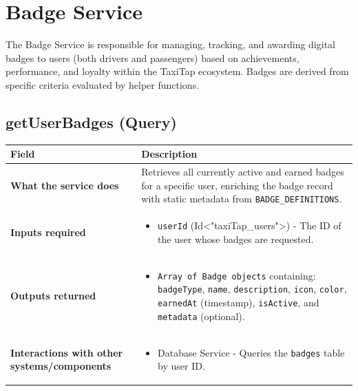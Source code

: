 \documentclass[11pt,a4paper]{article}
\begin{document}
\section{Badge Service}
\label{sec:badge-service}

The Badge Service is responsible for managing, tracking, and awarding digital badges to users (both drivers and passengers) based on achievements, performance, and loyalty within the TaxiTap ecosystem. Badges are derived from specific criteria evaluated by helper functions.

\subsection{getUserBadges (Query)}
\label{sub:getUserBadges}
\begin{longtable}{|p{4cm}|p{12cm}|}
\hline
\textbf{Field} & \textbf{Description} \\
\hline
\textbf{What the service does} & 
Retrieves all currently active and earned badges for a specific user, enriching the badge record with static metadata from \texttt{BADGE\_DEFINITIONS}. \\
\hline
\textbf{Inputs required} & 
\begin{itemize}[nosep]
\item \texttt{userId} (Id<"taxiTap\_users">) - The ID of the user whose badges are requested.
\end{itemize} \\
\hline
\textbf{Outputs returned} & 
\begin{itemize}[nosep]
\item \texttt{Array of Badge objects} containing: \texttt{badgeType}, \texttt{name}, \texttt{description}, \texttt{icon}, \texttt{color}, \texttt{earnedAt} (timestamp), \texttt{isActive}, and \texttt{metadata} (optional).
\end{itemize} \\
\hline
\textbf{Interactions with other systems/components} & 
\begin{itemize}[nosep]
\item Database Service - Queries the \texttt{badges} table by user ID.
\end{itemize} \\
\hline
\end{longtable}
\end{document}
